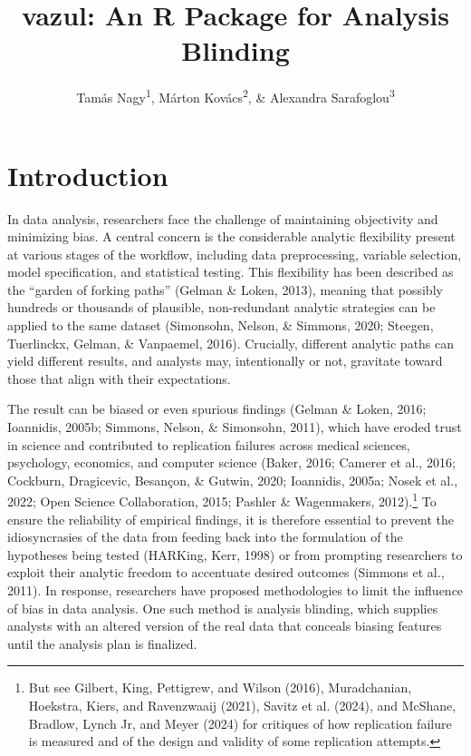 \documentclass[
  english,
  man,floatsintext]{apa6}
\title{vazul: An R Package for Analysis Blinding}
\author{Tamás Nagy\textsuperscript{1}, Márton Kovács\textsuperscript{2}, \& Alexandra Sarafoglou\textsuperscript{3}}
\date{}
\affiliation{\vspace{0.5cm}\textsuperscript{1} Institute of Psychology, ELTE Eötvös Loránd University\\\textsuperscript{2} Independent researcher\\\textsuperscript{3} Department of Psychology, University of Amsterdam}
\begin{document}
\maketitle

\section{Introduction}\label{introduction}

In data analysis, researchers face the challenge of maintaining objectivity and minimizing bias. A central concern is the considerable analytic flexibility present at various stages of the workflow, including data preprocessing, variable selection, model specification, and statistical testing. This flexibility has been described as the ``garden of forking paths'' (Gelman \& Loken, 2013), meaning that possibly hundreds or thousands of plausible, non-redundant analytic strategies can be applied to the same dataset (Simonsohn, Nelson, \& Simmons, 2020; Steegen, Tuerlinckx, Gelman, \& Vanpaemel, 2016). Crucially, different analytic paths can yield different results, and analysts may, intentionally or not, gravitate toward those that align with their expectations.

The result can be biased or even spurious findings (Gelman \& Loken, 2016; Ioannidis, 2005b; Simmons, Nelson, \& Simonsohn, 2011), which have eroded trust in science and contributed to replication failures across medical sciences, psychology, economics, and computer science (Baker, 2016; Camerer et al., 2016; Cockburn, Dragicevic, Besançon, \& Gutwin, 2020; Ioannidis, 2005a; Nosek et al., 2022; Open Science Collaboration, 2015; Pashler \& Wagenmakers, 2012).\footnote{But see Gilbert, King, Pettigrew, and Wilson (2016), Muradchanian, Hoekstra, Kiers, and Ravenzwaaij (2021), Savitz et al. (2024), and McShane, Bradlow, Lynch Jr, and Meyer (2024) for critiques of how replication failure is measured and of the design and validity of some replication attempts.} To ensure the reliability of empirical findings, it is therefore essential to prevent the idiosyncrasies of the data from feeding back into the formulation of the hypotheses being tested (HARKing, Kerr, 1998) or from prompting researchers to exploit their analytic freedom to accentuate desired outcomes (Simmons et al., 2011). In response, researchers have proposed methodologies to limit the influence of bias in data analysis. One such method is analysis blinding, which supplies analysts with an altered version of the real data that conceals biasing features until the analysis plan is finalized.
\end{document}
